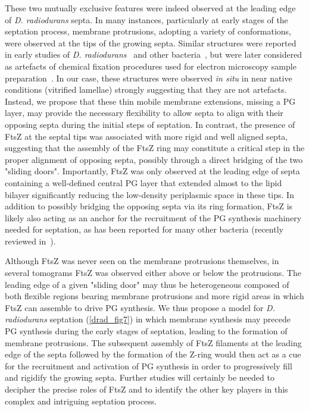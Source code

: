 These two mutually exclusive features were indeed observed at the leading edge of \textit{D. radiodurans} septa.
In many instances, particularly at early stages of the septation process, membrane protrusions, adopting a variety of conformations, were observed at the tips of the growing septa.
Similar structures were reported in early studies of \textit{D. radiodurans}~\cite{thornleyFineStructureMicrococcus1965,sleytrStudyFreezeetchingFine1973} and other bacteria~\cite{suganumaStudiesFineStructure1966,pontefractMesosomesEscherichiaColi1969}, but were later considered as artefacts of chemical fixation procedures used for electron microscopy sample preparation~\cite{ryterContributionNewCryomethods1988,dubochetElectronMicroscopyFrozenhydrated1983,liedtkeHowAdvancesCryoelectron2022}.
In our case, these structures were observed \textit{in situ} in near native conditions (vitrified lamellae) strongly suggesting that they are not artefacts.
Instead, we propose that these thin mobile membrane extensions, missing a PG layer, may provide the necessary flexibility to allow septa to align with their opposing septa during the initial steps of septation.
In contrast, the presence of FtsZ at the septal tips was associated with more rigid and well aligned septa, suggesting that the assembly of the FtsZ ring may constitute a critical step in the proper alignment of opposing septa, possibly through a direct bridging of the two "sliding doors".
Importantly, FtsZ was only observed at the leading edge of septa containing a well-defined central PG layer that extended almost to the lipid bilayer significantly reducing the low-density periplasmic space in these tips.
In addition to possibly bridging the opposing septa via its ring formation, FtsZ is likely also acting as an anchor for the recruitment of the PG synthesis machinery needed for septation, as has been reported for many other bacteria (recently reviewed in~\citet{barrowsFtsZDynamicsBacterial2021,mcquillenInsightsStructureFunction2020,cameronInsightsAssemblyRegulation2024}).

Although FtsZ was never seen on the membrane protrusions themselves, in several tomograms FtsZ was observed either above or below the protrusions.
The leading edge of a given "sliding door" may thus be heterogeneous composed of both flexible regions bearing membrane protrusions and more rigid areas in which FtsZ can assemble to drive PG synthesis.
We thus propose a model for \textit{D. radiodurans} septation (\autoref{drad_fig7}) in which membrane synthesis may precede PG synthesis during the early stages of septation, leading to the formation of membrane protrusions.
The subsequent assembly of FtsZ filaments at the leading edge of the septa followed by the formation of the Z-ring would then act as a cue for the recruitment and activation of PG synthesis in order to progressively fill and rigidify the growing septa.
Further studies will certainly be needed to decipher the precise roles of FtsZ and to identify the other key players in this complex and intriguing septation process.

